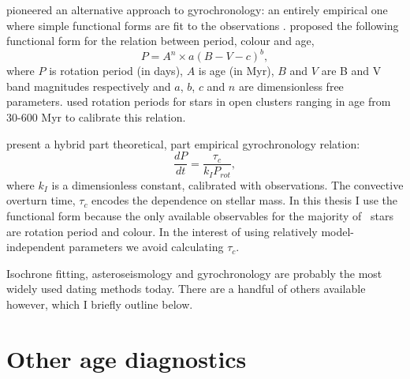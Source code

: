 \citet{Barnes2003} pioneered an alternative approach to gyrochronology: an
entirely empirical one where simple functional forms are fit to the
observations \citep[\eg][]{Barnes2007, Mamajek2008}.
\citet{Barnes2003} proposed the following functional form for the relation
between period, colour and age, \begin{equation} \label{eq:Barnes2007_2} P =
A^n \times a(B-V-c)^b, \end{equation} where $P$ is rotation period (in days),
$A$ is age (in Myr), $B$ and $V$ are B and V band magnitudes respectively and
$a$, $b$, $c$ and $n$ are dimensionless free parameters.
\citet{Barnes2007} used rotation periods for stars in open clusters ranging in
age from 30-600 Myr to calibrate this relation.

\citet{Barnes2010b} present a hybrid part theoretical, part empirical
gyrochronology relation:
\begin{equation}
\frac{dP}{dt} = \frac{\tau_c}{k_IP_{rot}},
\end{equation}
where $k_I$ is a dimensionless constant, calibrated with observations.
The convective overturn time, $\tau_c$ encodes the dependence on stellar mass.
In this thesis I use the \citet{Barnes2003} functional form because the only
available observables for the majority of \kepler\ stars are rotation period
and colour.
In the interest of using relatively model-independent parameters we avoid
calculating $\tau_c$.

Isochrone fitting, asteroseismology and gyrochronology are probably the most
widely used dating methods today.
There are a handful of others available however, which I briefly outline
below.

\section{Other age diagnostics}
\label{sec:activity}

